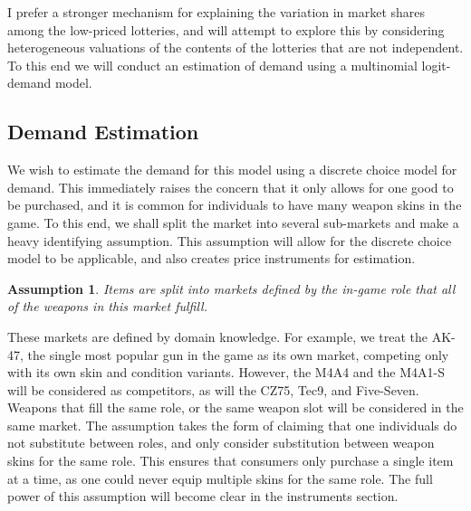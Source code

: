 \documentclass[12pt]{paper}
\newtheorem{assume}{Assumption}
\begin{document}
I prefer a stronger mechanism for explaining the variation in
market shares among the low-priced lotteries, and will attempt to
explore this by considering heterogeneous valuations of the contents
of the lotteries that are not independent. To this end we will conduct
an estimation of demand using a multinomial logit-demand model. 






 \subsection{Demand Estimation}

We wish to estimate the demand for this model using a discrete choice
model for demand. This immediately raises the concern that it only
allows for one good to be purchased, and it is common for individuals
to have many weapon skins in the game. To this end, we shall split the
market into several sub-markets and make a heavy identifying
assumption. This assumption will allow for the discrete choice model
to be applicable, and also creates price instruments for estimation.

\begin{assume}
  Items are split into markets defined by the in-game role that all of
  the weapons in this market fulfill.
\end{assume}

These markets are defined by domain knowledge. For example, we treat
the AK-47, the single most popular gun in the game as its own market,
competing only with its own skin and condition variants. However, the
M4A4 and the M4A1-S will be considered as competitors, as will the
CZ75, Tec9, and Five-Seven. Weapons that fill the same role, or the
same weapon slot will be considered in the same market. The assumption
takes the form of claiming that one individuals do not substitute
between roles, and only consider substitution between weapon skins for
the same role. This ensures that consumers only purchase a single item
at a time, as one could never equip multiple skins for the same
role. The full power of this assumption will become clear in the
instruments section.
\end{document}
